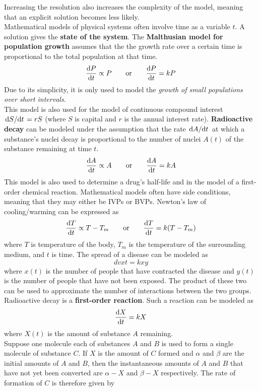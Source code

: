 \documentclass[../Differential Equations.tex]{subfiles}
\begin{document}
			Increasing the resolution also increases the complexity of the model, meaning that an explicit solution becomes less likely. \\
			Mathematical models of physical systems often involve time as a variable \(t\). A solution gives the \textbf{state of the system}.
			The \textbf{Malthusian model for population growth} assumes that the the growth rate over a certain time is proportional to the total population at that time.
				\[\dv{P}{t} \propto P \qquad \text{or} \qquad \dv{P}{t} = kP\]
				Due to its simplicity, it is only used to model the \textit{growth of small populations over short intervals}. \\
				This model is also used for the model of continuous compound interest \(\dv*{S}{t} = rS\) (where \(S\) is capital and \(r\) is the annual interest rate).
			\textbf{Radioactive decay} can be modeled under the assumption that the rate \(\dv*{A}{t}\) at which a substance's nuclei decay is proportional to the number of nuclei \(A(t)\) of the substance remaining at time \(t\).
				\[\dv{A}{t} \propto A \qquad \text{or} \qquad \dv{A}{t} = kA\]
			This model is also used to determine a drug's half-life and in the model of a first-order chemical reaction.
			Mathematical models often have side conditions, meaning that they may either be IVPs or BVPs.
			Newton's law of cooling/warming can be expressed as 
				\[\dv{T}{t} \propto T - T_m \qquad \text{or} \qquad \dv{T}{t} = k(T - T_m)\]
				where \(T\) is temperature of the body, \(T_m\) is the temperature of the surrounding medium, and \(t\) is time.
			The spread of a disease can be modeled as
				\[dv{x}{t} = kxy\]
				where \(x(t)\) is the number of people that have contracted the disease and \(y(t)\) is the number of people that have not been exposed. The product of these two can be used to approximate the number of interactions between the two groups.
			Radioactive decay is a \textbf{first-order reaction}. Such a reaction can be modeled as
				\[\dv{X}{t} = kX\]
				where \(X(t)\) is the amount of substance \(A\) remaining. \\
			Suppose one molecule each of substances \(A\) and \(B\) is used to form a single molecule of substance \(C\). If \(X\) is the amount of \(C\) formed and \(\alpha\) and \(\beta\) are the initial amounts of \(A\) and \(B\), then the instantaneous amounts of \(A\) and \(B\) that have not yet been converted are \(\alpha - X\) and \(\beta - X\) respectively. The rate of formation of \(C\) is therefore given by
\end{document}
